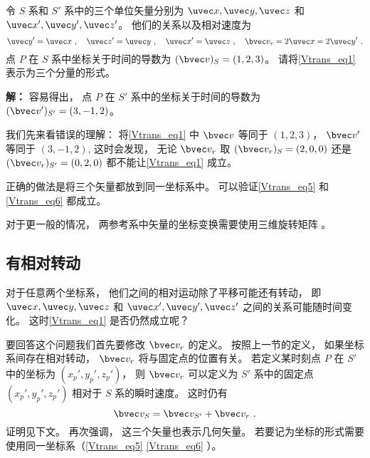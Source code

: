 \begin{example}{}\label{Vtrans_ex2}
令 $S$ 系和 $S'$ 系中的三个单位矢量分别为 $\uvec x, \uvec y, \uvec z$ 和 $\uvec x', \uvec y', \uvec z'$。 他们的关系以及相对速度为
\begin{equation}
\uvec y' = \uvec x~, \quad
\uvec z' = \uvec y~, \quad
\uvec x' = \uvec z~, \quad
\bvec v_r = 2\uvec x = 2\uvec y'~.
\end{equation}
点 $P$ 在 $S$ 系中坐标关于时间的导数为 $(\bvec v)_S = (1, 2, 3)$。 请将\autoref{Vtrans_eq1} 表示为三个分量的形式。

\textbf{解：} 容易得出， 点 $P$ 在 $S'$ 系中的坐标关于时间的导数为 $(\bvec v')_{S'} = (3, -1, 2)$。

我们先来看错误的理解： 将\autoref{Vtrans_eq1} 中 $\bvec v$ 等同于 $(1, 2, 3)$， $\bvec v'$ 等同于 $(3, -1, 2)$,  这时会发现， 无论 $\bvec v_r$ 取 $(\bvec v_r)_S = (2, 0, 0)$ 还是 $(\bvec v_r)_{S'} = (0, 2, 0)$ 都不能让\autoref{Vtrans_eq1} 成立。

正确的做法是将三个矢量都放到同一坐标系中。 可以验证\autoref{Vtrans_eq5} 和\autoref{Vtrans_eq6} 都成立。

对于更一般的情况， 两参考系中矢量的坐标变换需要使用三维旋转矩阵 。
\end{example}

\subsection{有相对转动}
对于任意两个坐标系， 他们之间的相对运动除了平移可能还有转动， 即 $\uvec x, \uvec y, \uvec z$ 和 $\uvec x', \uvec y', \uvec z'$ 之间的关系可能随时间变化。 这时\autoref{Vtrans_eq1} 是否仍然成立呢？

要回答这个问题我们首先要修改 $\bvec v_r$ 的定义。 按照上一节的定义， 如果坐标系间存在相对转动， $\bvec v_r$ 将与固定点的位置有关。 若定义某时刻点 $P$ 在 $S'$ 中的坐标为 $(x_p', y_p', z_p')$， 则 $\bvec v_r$ 可以定义为 $S'$ 系中的固定点 $(x_p', y_p', z_p')$ 相对于 $S$ 系的瞬时速度。 这时仍有
\begin{equation}\label{Vtrans_eq2}
\bvec v_{S} = \bvec v_{S'} + \bvec v_r~.
\end{equation}
证明见下文。 再次强调， 这三个矢量也表示几何矢量。 若要记为坐标的形式需要使用同一坐标系（\autoref{Vtrans_eq5} \autoref{Vtrans_eq6} ）。

